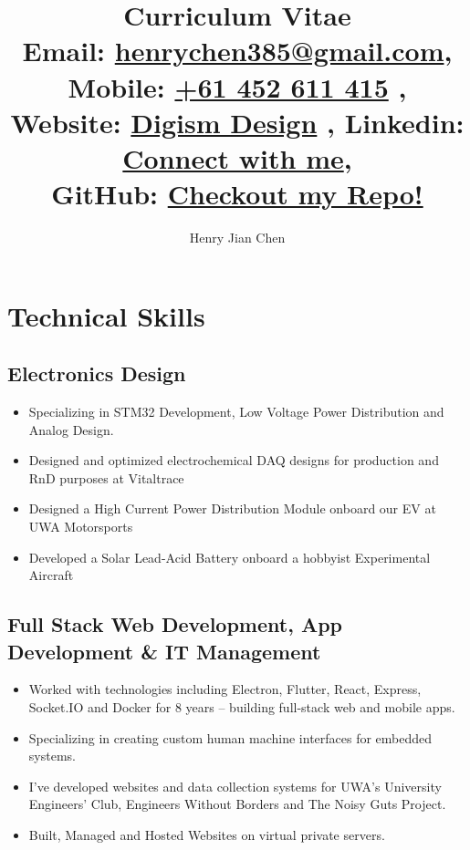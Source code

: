 \documentclass{article}[a4page]
\title{
Curriculum Vitae \\
\small{Email: \href{mailto:henrychen385@gmail.com}{henrychen385@gmail.com}}, 
\small{Mobile: \href{tel:61452611415}{+61 452 611 415} }, \\
\small{Website:  \href{https://digism.xyz}{Digism Design} },
\small{Linkedin: \href{https://www.linkedin.com/in/henry-chen-21b672176/}{Connect with me}},\\
\small{GitHub: \href{https://github.com/jumper385}{Checkout my Repo!}}
}
\author{Henry Jian Chen}
\begin{document}
\maketitle
{}

\section*{Technical Skills}
\subsection*{Electronics Design}
\begin{itemize}
    \item Specializing in STM32 Development, Low Voltage Power Distribution and Analog Design.
    \item Designed and optimized electrochemical DAQ designs for production and RnD purposes at Vitaltrace 
    \item Designed a High Current Power Distribution Module onboard our EV at UWA Motorsports
    \item Developed a Solar Lead-Acid Battery onboard a hobbyist Experimental Aircraft
\end{itemize}

\subsection*{Full Stack Web Development, App Development \& IT Management \hfill}
\begin{itemize}
\item Worked with technologies including Electron, Flutter, React, Express, Socket.IO and Docker for 8 years – building full-stack web and mobile apps.
\item Specializing in creating custom human machine interfaces for embedded systems.
\item I've developed websites and data collection systems for UWA's University Engineers' Club, Engineers Without Borders and The Noisy Guts Project.
\item Built, Managed and Hosted Websites on virtual private servers.
\end{itemize}
\end{document}
